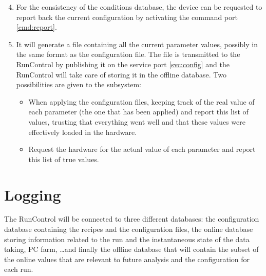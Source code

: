 \documentclass[a4paper]{article}
\begin{document}
\begin{enumerate}
	\setcounter{enumi}{3}
	\item For the consistency of the conditions database, the device can be requested to report back
	the current configuration by activating the command port \ref{cmd:report}.
	\item It will generate a file containing all the current parameter values, possibly in the same
	format as the configuration file. The file is transmitted to the RunControl by publishing it on
	the service port \ref{svc:config} and the RunControl will take care of storing it in the offline
	database. Two possibilities are given to the subsystem:
	\begin{itemize}
		\item When applying the configuration files, keeping track of the real value of each parameter
		(the one that has been applied) and report this list of values, trusting that everything went
		well and that these values were effectively loaded in the hardware.
		\item Request the hardware for the actual value of each parameter and report this list of true
		values.
	\end{itemize}
\end{enumerate}

\section{Logging}\label{sec:logging}
The RunControl will be connected to three different databases: the configuration database containing
the recipes and the configuration files, the online database storing information related to the
run and the instantaneous state of the data taking, PC farm, \ldots and finally the offline
database that will contain the subset of the online values that are relevant to future analysis and
the configuration for each run.

\end{document}
